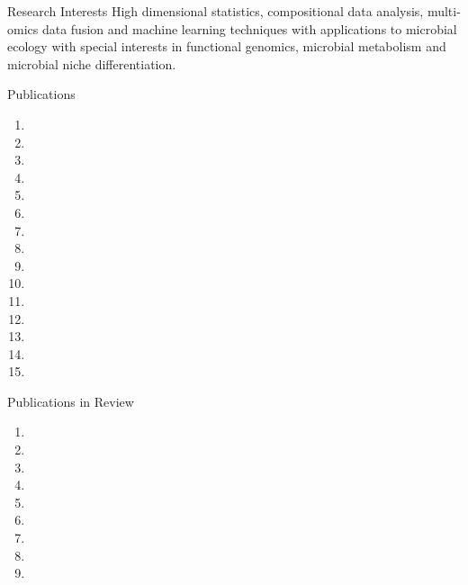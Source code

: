 \documentclass{resume} %
\begin{document}
\begin{rSection}{Research Interests}
  High dimensional statistics, compositional data analysis, multi-omics data fusion and machine learning techniques with applications to microbial ecology with special interests in functional genomics, microbial metabolism and microbial niche differentiation.
\end{rSection}
\begin{rSection}{Publications}
  \begin{enumerate}
    \item {}
    \item {}
    \item {}
    \item {}
    \item {}
    \item {}
    \item {}
    \item {}
    \item {}
    \item {}
    \item {}
    \item {}
    \item {}\newpage
    \item {}
    \item {}
  \end{enumerate}
\end{rSection}

\begin{rSection}{Publications in Review}
  \begin{enumerate}
    \item {}
    \item {}
    \item {}
    \item {}
    \item {}
    \item {}
    \item {}
    \item {}
    \item {} \newpage
  \end{enumerate}
\end{rSection}
\end{document}
